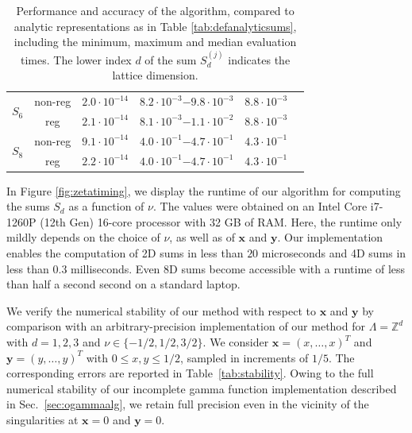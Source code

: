 \documentclass[]{amsart}
\newcommand{\new}[1]{#1}
\numberwithin{mythm}{section}
\begin{document}
\begin{table}
\begin{tabular}{cccccc}
\midrule
\multirow{2}{*}{$S_6$} & non-reg & $2.0\cdot 10^{-14}$ & $8.2\cdot 10^{-3}$$-$$9.8\cdot 10^{-3}$ & $8.8\cdot 10^{-3}$ \\ 
			         & reg & $2.1\cdot 10^{-14}$ & $8.1\cdot 10^{-3}$$-$$1.1\cdot 10^{-2}$ & $8.8\cdot 10^{-3}$ \\

\midrule
\multirow{2}{*}{$S_8$} & non-reg & $9.1\cdot 10^{-14}$ & $4.0\cdot 10^{-1}$$-$$4.7\cdot 10^{-1}$ & $4.3\cdot 10^{-1}$ \\ 
			         & reg & $2.2\cdot 10^{-14}$ & $4.0\cdot 10^{-1}$$-$$4.7\cdot 10^{-1}$ & $4.3\cdot 10^{-1}$ \\
     \bottomrule
\end{tabular}
\caption{Performance and accuracy of the algorithm, compared to analytic representations as in 
Table \ref{tab:defanalyticsums}\new{, including the minimum, maximum and median evaluation times}.
The lower index $d$ of the sum $S_d^{(j)}$ indicates the lattice dimension.}
\label{fig:perfacc}
\end{table}




In  Figure \ref{fig:zetatiming}, we display the runtime of our algorithm for computing the sums $S_d$ as a function of $\nu$. The values were obtained on an Intel Core i7-1260P (12th Gen) 16-core processor with 32 GB of RAM. Here, the runtime only mildly depends on the choice of $\nu$, as well as of $\bm x$ and $\bm y$. Our implementation enables the computation of 2D sums in less than $20$ microseconds and 4D sums in less than \new{$0.3$} milliseconds. Even 8D sums become accessible with a runtime of less than \new{half a second} second on a standard laptop.

\new{We verify the numerical stability of our method with respect to $\bm x$ and $\bm y$ by comparison with an arbitrary-precision implementation of our method for $\Lambda=\mathds Z^d$ with $d=1,2,3$ and $\nu\in\{-1/2,1/2,3/2\}$. We consider $\bm x=(x,\dots,x)^T$ and $\bm y=(y,\dots,y)^T$ with $0\le x,y\le 1/2$, sampled in increments of $1/5$. The corresponding errors are reported in Table~\ref{tab:stability}. Owing to the full numerical stability of our incomplete gamma function implementation described in Sec.~\ref{sec:ogammaalg}, we retain full precision even in the vicinity of the singularities at $\bm x=0$ and $\bm y=0$.}
\end{document}
